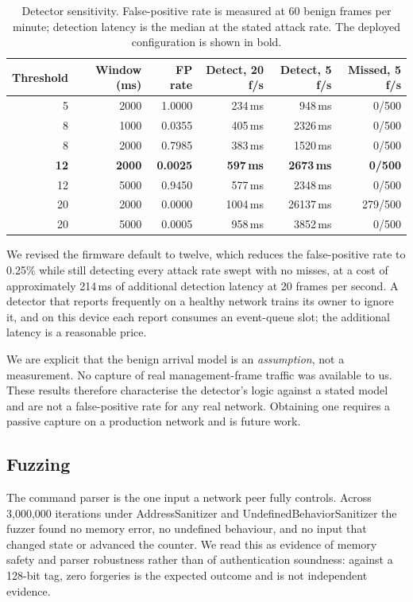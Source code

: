 \begin{table}[htbp]
\centering\small
\caption{Detector sensitivity. False-positive rate is measured at 60 benign frames per minute;
detection latency is the median at the stated attack rate. The deployed configuration is shown
in bold.}
\label{tab:sensitivity}
\begin{tabular}{@{}rrrrrr@{}}
\toprule
Threshold & Window (ms) & FP rate & Detect, 20 f/s & Detect, 5 f/s & Missed, 5 f/s \\
\midrule
5  & 2000 & 1.0000 & 234\,ms & 948\,ms  & 0/500 \\
8  & 1000 & 0.0355 & 405\,ms & 2326\,ms & 0/500 \\
8  & 2000 & 0.7985 & 383\,ms & 1520\,ms & 0/500 \\
\textbf{12} & \textbf{2000} & \textbf{0.0025} & \textbf{597\,ms} & \textbf{2673\,ms} & \textbf{0/500} \\
12 & 5000 & 0.9450 & 577\,ms & 2348\,ms & 0/500 \\
20 & 2000 & 0.0000 & 1004\,ms & 26137\,ms & 279/500 \\
20 & 5000 & 0.0005 & 958\,ms & 3852\,ms & 0/500 \\
\bottomrule
\end{tabular}
\end{table}

We revised the firmware default to twelve, which reduces the false-positive rate to 0.25\% while
still detecting every attack rate swept with no misses, at a cost of approximately 214\,ms of
additional detection latency at 20 frames per second. A detector that reports frequently on a
healthy network trains its owner to ignore it, and on this device each report consumes an
event-queue slot; the additional latency is a reasonable price.

We are explicit that the benign arrival model is an \emph{assumption}, not a measurement. No
capture of real management-frame traffic was available to us. These results therefore
characterise the detector's logic against a stated model and are not a false-positive rate for
any real network. Obtaining one requires a passive capture on a production network and is
future work.

\subsection{Fuzzing}

The command parser is the one input a network peer fully controls. Across 3{,}000{,}000
iterations under AddressSanitizer and UndefinedBehaviorSanitizer the fuzzer found no memory
error, no undefined behaviour, and no input that changed state or advanced the counter. We read
this as evidence of memory safety and parser robustness rather than of authentication soundness:
against a 128-bit tag, zero forgeries is the expected outcome and is not independent evidence.

